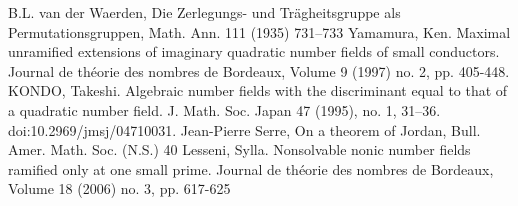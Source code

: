 \documentclass[preprint,12pt,reqno]{elsarticle}
\begin{document}
\begin{thebibliography}{9}
 B.L. van der Waerden, Die Zerlegungs- und Trägheitsgruppe als Permutationsgruppen, Math. Ann. 111 (1935) 731–733
 Yamamura, Ken. Maximal unramified extensions of imaginary quadratic number fields of small conductors. Journal de théorie des nombres de Bordeaux, Volume 9 (1997) no. 2, pp. 405-448.
 KONDO, Takeshi. Algebraic number fields with the discriminant equal to that of a quadratic number field. J. Math. Soc. Japan 47 (1995), no. 1, 31--36. doi:10.2969/jmsj/04710031.
 Jean-Pierre Serre, On a theorem of Jordan, Bull. Amer. Math. Soc. (N.S.) 40 
 Lesseni, Sylla. Nonsolvable nonic number fields ramified only at one small prime. Journal de théorie des nombres de Bordeaux, Volume 18 (2006) no. 3, pp. 617-625
\end{thebibliography}
\end{document}
